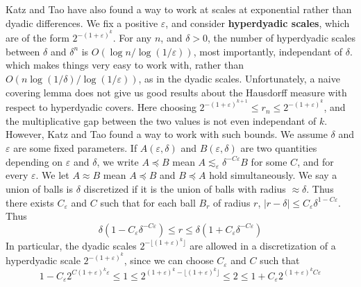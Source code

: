 \documentclass{report}
\theoremstyle{plain}
\theoremstyle{plain}
\begin{document}
Katz and Tao have also found a way to work at scales at exponential rather than dyadic differences. We fix a positive $\varepsilon$, and consider {\bf hyperdyadic scales}, which are of the form $2^{- (1 + \varepsilon)^k}$. For any $n$, and $\delta > 0$, the number of hyperdyadic scales between $\delta$ and $\delta^n$ is $O(\log n / \log (1/\varepsilon))$, most importantly, independant of $\delta$. which makes things very easy to work with, rather than $O(n \log(1/\delta)/\log (1/\varepsilon))$, as in the dyadic scales. Unfortunately, a naive covering lemma does not give us good results about the Hausdorff measure with respect to hyperdyadic covers. Here choosing $2^{-(1 + \varepsilon)^{k+1}} \leq r_n \leq 2^{-(1 + \varepsilon)^k}$, and the multiplicative gap between the two values is not even independant of $k$. However, Katz and Tao found a way to work with such bounds. We assume $\delta$ and $\varepsilon$ are some fixed parameters. If $A(\varepsilon, \delta)$ and $B(\varepsilon,\delta)$ are two quantities depending on $\varepsilon$ and $\delta$, we write $A \preccurlyeq B$ mean $A \lesssim_\varepsilon \delta^{-C \varepsilon} B$ for some $C$, and for every $\varepsilon$. We let $A \approx B$ mean $A \preccurlyeq B$ and $B \preccurlyeq A$ hold simultaneously. We say a union of balls is $\delta$ discretized if it is the union of balls with radius $\approx \delta$. Thus there exists $C_\varepsilon$ and $C$ such that for each ball $B_r$ of radius $r$, $|r - \delta| \leq C_\varepsilon \delta^{1-C \varepsilon}$. Thus
%
\[ \delta(1 - C_\varepsilon \delta^{-C \varepsilon}) \leq r \leq \delta(1 + C_\varepsilon \delta^{- C \varepsilon}) \]
%
In particular, the dyadic scales $2^{-\lfloor (1 + \varepsilon)^k \rfloor}$ are allowed in a discretization of a hyperdyadic scale $2^{-(1+\varepsilon)^k}$, since we can choose $C_\varepsilon$ and $C$ such that
%
\[ 1 - C_\varepsilon 2^{C (1 + \varepsilon)^k \varepsilon} \leq 1 \leq 2^{(1 + \varepsilon)^k -\lfloor (1 + \varepsilon)^k \rfloor} \leq 2 \leq 1 + C_\varepsilon 2^{(1 + \varepsilon)^k C \varepsilon} \]
\end{document}
